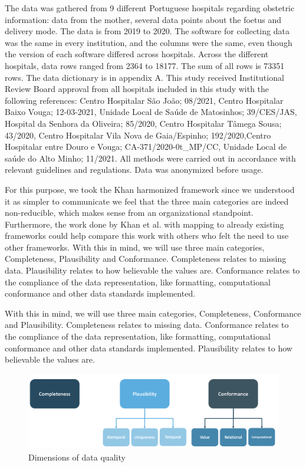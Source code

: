 
The data was gathered from 9 different Portuguese hospitals regarding obstetric information: data from the mother, several data points about the foetus and delivery mode. The data is from 2019 to 2020. The software for collecting data was the same in every institution, and the columns were the same, even though the version of each software differed across hospitals. Across the different hospitals, data rows ranged from 2364 to 18177. The sum of all rows is 73351 rows. The data dictionary is in appendix A. This study received Institutional Review Board approval from all hospitals included in this study with the following references: Centro Hospitalar São João; 08/2021, Centro Hospitalar Baixo Vouga; 12-03-2021, Unidade Local de Saúde de Matosinhos; 39/CES/JAS, Hospital da Senhora da Oliveira; 85/2020, Centro Hospitalar Tâmega Sousa; 43/2020, Centro Hospitalar Vila Nova de Gaia/Espinho; 192/2020,Centro Hospitalar entre Douro e Vouga; CA-371/2020-0t\_MP/CC, Unidade Local de saúde do Alto Minho; 11/2021. All methods were carried out in accordance with relevant guidelines and regulations. Data was anonymized before usage.

For this purpose, we took the Khan harmonized framework since we understood it as simpler to communicate we feel that the three main categories are indeed non-reducible, which makes sense from an organizational standpoint. Furthermore, the work done by Khan et al. with mapping to already existing frameworks could help compare this work with others who felt the need to use other frameworks. With this in mind, we will use three main categories, Completeness, Plausibility and Conformance. Completeness relates to missing data. Plausibility relates to how believable the values are. Conformance relates to the compliance of the data representation, like formatting, computational conformance and other data standards implemented. 

With this in mind, we will use three main categories, Completeness, Conformance and Plausibility. Completeness relates to missing data. Conformance relates to the compliance of the data representation, like formatting, computational conformance and other data standards implemented. Plausibility relates to how believable the values are.

\begin{figure}[htbp]
\centering
\caption{Dimensions of data quality}\label{fig:categories} 
\includegraphics[scale=0.29]{figures/data-quality-v1.png}
\end{figure}
